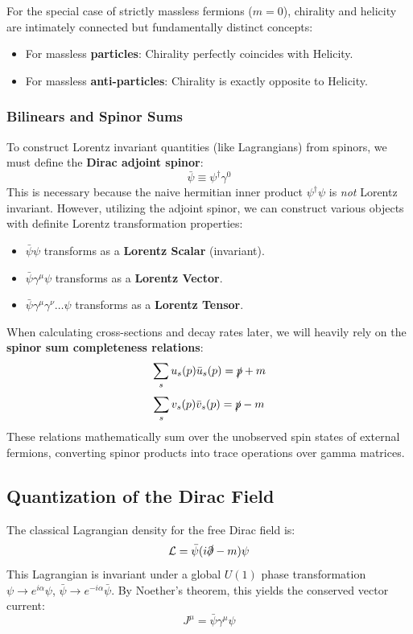 \begin{remark}
    For the special case of strictly massless fermions ($m=0$), chirality and helicity are intimately connected but fundamentally distinct concepts:
    \begin{itemize}
        \item For massless \textbf{particles}: Chirality perfectly coincides with Helicity.
        \item For massless \textbf{anti-particles}: Chirality is exactly opposite to Helicity.
    \end{itemize}
\end{remark}

\subsubsection{Bilinears and Spinor Sums}
To construct Lorentz invariant quantities (like Lagrangians) from spinors, we must define the \textbf{Dirac adjoint spinor}:
\[
    \bar{\psi} \equiv \psi^\dagger \gamma^0
\]
This is necessary because the naive hermitian inner product $\psi^\dagger \psi$ is \textit{not} Lorentz invariant. However, utilizing the adjoint spinor, we can construct various objects with definite Lorentz transformation properties:
\begin{itemize}
    \item $\bar{\psi} \psi$ transforms as a \textbf{Lorentz Scalar} (invariant).
    \item $\bar{\psi} \gamma^\mu \psi$ transforms as a \textbf{Lorentz Vector}.
    \item $\bar{\psi} \gamma^\mu \gamma^\nu \dots \psi$ transforms as a \textbf{Lorentz Tensor}.
\end{itemize}

When calculating cross-sections and decay rates later, we will heavily rely on the \textbf{spinor sum completeness relations}:
\[
    \sum_s u_s(p) \bar{u}_s(p) = \slashed{p} + m
\]
\[
    \sum_s v_s(p) \bar{v}_s(p) = \slashed{p} - m
\]
These relations mathematically sum over the unobserved spin states of external fermions, converting spinor products into trace operations over gamma matrices.


\subsection{Quantization of the Dirac Field}

The classical Lagrangian density for the free Dirac field is:
\[
    \mathcal{L} = \bar{\psi}(i\slashed{\partial} - m)\psi
\]
This Lagrangian is invariant under a global $U(1)$ phase transformation $\psi \to e^{i\alpha}\psi$, $\bar{\psi} \to e^{-i\alpha}\bar{\psi}$. By Noether's theorem, this yields the conserved vector current:
\[
    J^\mu = \bar{\psi} \gamma^\mu \psi
\]

